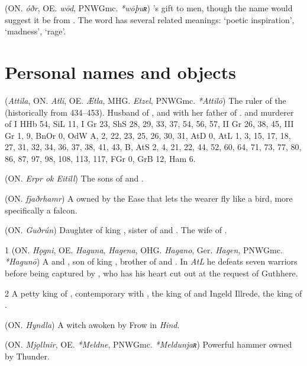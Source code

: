 \begin{itemize}
 (ON. \emph{óðr}, OE. \emph{wōd}, PNWGmc. \emph{*wōþuʀ})
  's gift to men, though the name would suggest it be from . The word has several related meanings: ‘poetic inspiration’, ‘madness’, ‘rage’.

\end{itemize}


\section{Personal names and objects}
\begin{itemize}

 (\emph{Attila}, ON. \emph{Atli}, OE. \emph{Ætla}, MHG. \emph{Etzel}, PNWGmc. \emph{*Attilō})
  The ruler of the  (historically from 434–453). Husband of , and with her father of . and murderer of
  I HHb 54, SiL 11, I Gr 23, ShS 28, 29, 33, 37, 54, 56, 57, II Gr 26, 38, 45, III Gr 1, 9, BnOr 0, OdW A, 2, 22, 23, 25, 26, 30, 31, AtD 0, AtL 1, 3, 15, 17, 18, 27, 31, 32, 34, 36, 37, 38, 41, 43, B, AtS 2, 4, 21, 22, 44, 52, 60, 64, 71, 73, 77, 80, 86, 87, 97, 98, 108, 113, 117, FGr 0, GrB 12, Ham 6.

 (ON. \emph{Erpr ok Eitill})
  The sons of  and .

 (ON. \emph{fjaðrhamr})
  A  owned by the Ease that lets the wearer fly like a bird, more specifically a falcon.

 (ON. \emph{Guðrún})
  Daughter of king , sister of  and . The wife of .

 1 (ON. \emph{Hǫgni}, OE. \emph{Haguna}, \emph{Hagena}, OHG. \emph{Hagano}, Ger. \emph{Hagen}, PNWGmc. \emph{*Hagunō})
  A  and , son of king , brother of  and . In \emph{AtL} he defeats seven warriors before being captured by , who has his heart cut out at the request of Guthhere.

 2 A petty king of , contemporary with , the king of  and Ingeld Illrede, the  king of .

 (ON. \emph{Hyndla}) A witch awoken by Frow in \emph{Hind}.

 (ON. \emph{Mjǫllnir}, OE. \emph{*Meldne}, PNWGmc. \emph{*Meldunjaʀ})
  Powerful hammer owned by Thunder.


\end{itemize}

